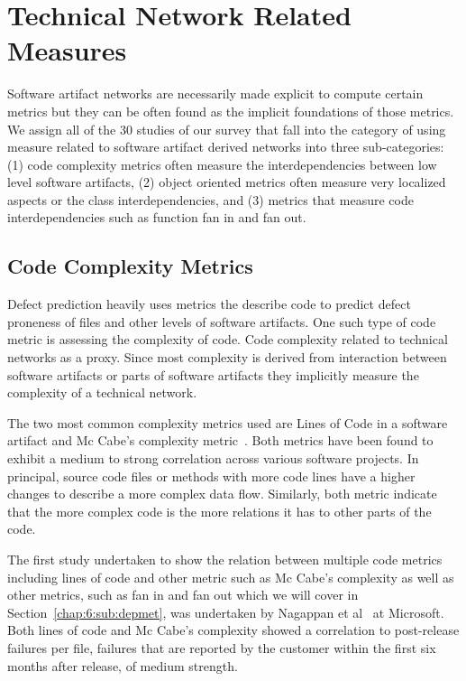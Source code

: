 \section{Technical Network Related Measures}
\label{chap:6:measure}
Software artifact networks are necessarily made explicit to compute certain metrics but they can be often found as the implicit foundations of those metrics.
We assign all of the 30 studies of our survey that fall into the category of using measure related to software artifact derived networks into three sub-categories:
(1) code complexity metrics often measure the interdependencies between low level software artifacts,
(2) object oriented metrics often measure very localized aspects or the class interdependencies,
and (3) metrics that measure code interdependencies such as function fan in and fan out.

\subsection{Code Complexity Metrics}
Defect prediction heavily uses metrics the describe code to predict defect proneness of files and other levels of software artifacts.
One such type of code metric is assessing the complexity of code.
Code complexity related to technical networks as a proxy.
Since most complexity is derived from interaction between software artifacts or parts of software artifacts they implicitly measure the complexity of a technical network.

The two most common complexity metrics used are Lines of Code in a software artifact and Mc Cabe's complexity metric~\cite{mccabe:ieee:1976}.
Both metrics have been found to exhibit a medium to strong correlation across various software projects.
In principal, source code files or methods with more code lines have a higher changes to describe a more complex data flow.
Similarly, both metric indicate that the more complex code is the more relations it has to other parts of the code.

The first study undertaken to show the relation between multiple code metrics including lines of code and other metric such as Mc Cabe's complexity as well as other metrics, such as fan in and fan out which we will cover in Section~\ref{chap:6:sub:depmet}, was undertaken by Nagappan et al~\cite{nagappan:icse:2006} at Microsoft.
Both lines of code and Mc Cabe's complexity showed a correlation to post-release failures per file, failures that are reported by the customer within the first six months after release, of medium strength.

